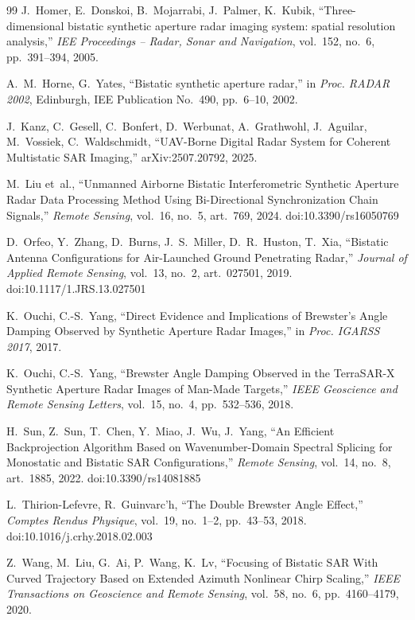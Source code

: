 \documentclass[11pt,a4paper]{article}
\begin{document}
\begin{thebibliography}{99}
 J.~Homer, E.~Donskoi, B.~Mojarrabi, J.~Palmer, K.~Kubik, ``Three-dimensional bistatic synthetic aperture radar imaging system: spatial resolution analysis,'' \emph{IEE Proceedings -- Radar, Sonar and Navigation}, vol.~152, no.~6, pp.~391--394, 2005.

 A.~M.~Horne, G.~Yates, ``Bistatic synthetic aperture radar,'' in \emph{Proc. RADAR 2002}, Edinburgh, IEE Publication No.~490, pp.~6--10, 2002.

 J.~Kanz, C.~Gesell, C.~Bonfert, D.~Werbunat, A.~Grathwohl, J.~Aguilar, M.~Vossiek, C.~Waldschmidt, ``UAV-Borne Digital Radar System for Coherent Multistatic SAR Imaging,'' arXiv:2507.20792, 2025.

 M.~Liu et~al., ``Unmanned Airborne Bistatic Interferometric Synthetic Aperture Radar Data Processing Method Using Bi-Directional Synchronization Chain Signals,'' \emph{Remote Sensing}, vol.~16, no.~5, art.~769, 2024. doi:10.3390/rs16050769

 D.~Orfeo, Y.~Zhang, D.~Burns, J.~S.~Miller, D.~R.~Huston, T.~Xia, ``Bistatic Antenna Configurations for Air-Launched Ground Penetrating Radar,'' \emph{Journal of Applied Remote Sensing}, vol.~13, no.~2, art.~027501, 2019. doi:10.1117/1.JRS.13.027501

 K.~Ouchi, C.-S.~Yang, ``Direct Evidence and Implications of Brewster's Angle Damping Observed by Synthetic Aperture Radar Images,'' in \emph{Proc. IGARSS 2017}, 2017.

 K.~Ouchi, C.-S.~Yang, ``Brewster Angle Damping Observed in the TerraSAR-X Synthetic Aperture Radar Images of Man-Made Targets,'' \emph{IEEE Geoscience and Remote Sensing Letters}, vol.~15, no.~4, pp.~532--536, 2018.

 H.~Sun, Z.~Sun, T.~Chen, Y.~Miao, J.~Wu, J.~Yang, ``An Efficient Backprojection Algorithm Based on Wavenumber-Domain Spectral Splicing for Monostatic and Bistatic SAR Configurations,'' \emph{Remote Sensing}, vol.~14, no.~8, art.~1885, 2022. doi:10.3390/rs14081885

 L.~Thirion-Lefevre, R.~Guinvarc'h, ``The Double Brewster Angle Effect,'' \emph{Comptes Rendus Physique}, vol.~19, no.~1--2, pp.~43--53, 2018. doi:10.1016/j.crhy.2018.02.003

 Z.~Wang, M.~Liu, G.~Ai, P.~Wang, K.~Lv, ``Focusing of Bistatic SAR With Curved Trajectory Based on Extended Azimuth Nonlinear Chirp Scaling,'' \emph{IEEE Transactions on Geoscience and Remote Sensing}, vol.~58, no.~6, pp.~4160--4179, 2020.


\end{thebibliography}
\end{document}

